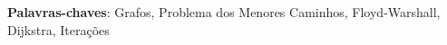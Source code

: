 

\setlength{\absparsep}{18pt} %
	\begin{resumo}
	
	
		\noindent
		\textbf{Palavras-chaves}: Grafos, Problema dos Menores Caminhos, Floyd-Warshall, Dijkstra, Iterações
	\end{resumo}
